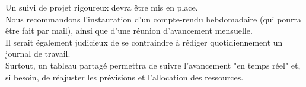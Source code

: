 Un suivi de projet rigoureux devra être mis en place.\\

Nous recommandons l'instauration d'un compte-rendu hebdomadaire (qui pourra être fait par mail), ainsi que d'une réunion d'avancement mensuelle.\\

Il serait également judicieux de se contraindre à rédiger quotidiennement un journal de travail.\\

Surtout, un tableau partagé permettra de suivre l'avancement "en temps réel" et, si besoin, de réajuster les prévisions et l'allocation des ressources.